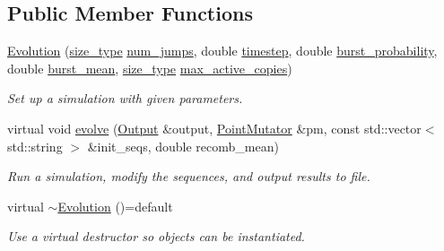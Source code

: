 \subsection*{Public Member Functions}
\begin{DoxyCompactItemize}
\item 
\mbox{\hyperlink{classrcombinator_1_1Evolution_a0aa94cf8dd5f6184535faf82842337fd}{Evolution}} (\mbox{\hyperlink{constants_8h_abcd18a5521fc90ff6e7b00e4fee98397}{size\+\_\+type}} \mbox{\hyperlink{classrcombinator_1_1Evolution_a9e4feea87909393e38280bf12c9ef2fc}{num\+\_\+jumps}}, double \mbox{\hyperlink{classrcombinator_1_1Evolution_a4199e62af41c1d4131547a0fa1eaedbe}{timestep}}, double \mbox{\hyperlink{classrcombinator_1_1Evolution_aabe7c0fa6f08d6b891762957770efafe}{burst\+\_\+probability}}, double \mbox{\hyperlink{classrcombinator_1_1Evolution_aaf24044a7c370487557c55e5c12fe1e5}{burst\+\_\+mean}}, \mbox{\hyperlink{constants_8h_abcd18a5521fc90ff6e7b00e4fee98397}{size\+\_\+type}} \mbox{\hyperlink{classrcombinator_1_1Evolution_a8a542398bf9a3a7d42623d4d090a6e96}{max\+\_\+active\+\_\+copies}})
\begin{DoxyCompactList}\small\item\em Set up a simulation with given parameters. \end{DoxyCompactList}\item 
virtual void \mbox{\hyperlink{classrcombinator_1_1Evolution_a0b8a181242ea8ee3072258fa7ed416f4}{evolve}} (\mbox{\hyperlink{classrcombinator_1_1Output}{Output}} \&output, \mbox{\hyperlink{classrcombinator_1_1PointMutator}{Point\+Mutator}} \&pm, const std\+::vector$<$ std\+::string $>$ \&init\+\_\+seqs, double recomb\+\_\+mean)
\begin{DoxyCompactList}\small\item\em Run a simulation, modify the sequences, and output results to file. \end{DoxyCompactList}\item 
\mbox{\label{classrcombinator_1_1Evolution_af59e41c84713f8956d3e4eb1691a1b38}} 
virtual \mbox{\hyperlink{classrcombinator_1_1Evolution_af59e41c84713f8956d3e4eb1691a1b38}{$\sim$\+Evolution}} ()=default
\begin{DoxyCompactList}\small\item\em Use a virtual destructor so objects can be instantiated. \end{DoxyCompactList}\end{DoxyCompactItemize}
